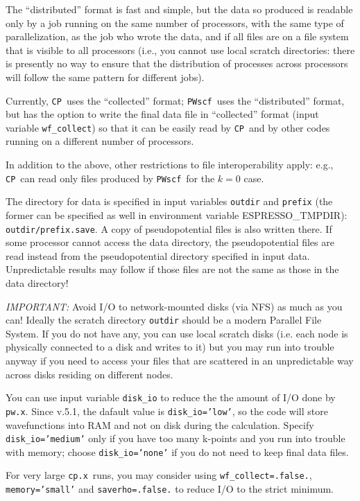 \documentclass[12pt,a4paper]{article}
\def\pwx{\texttt{pw.x}}
\def\cpx{\texttt{cp.x}}
\def\PWscf{\texttt{PWscf}}
\def\CP{\texttt{CP}}
\begin{document}
The ``distributed'' format is fast and simple,
but the data so produced is readable only by
a job running on the same number of processors,
with the same type of parallelization, as the
job who wrote the data, and if all
files are on a file system that is visible to all
processors (i.e., you cannot use local scratch
directories: there is presently no way to ensure
that the distribution of processes across
processors will follow the same pattern
for different jobs).

Currently, \CP\ uses the ``collected'' format;
\PWscf\ uses the ``distributed'' format, but
has the option to write the final data file in
``collected'' format (input variable \texttt{wf\_collect})
so that it can be easily read by \CP\ and by other
codes running on a different  number of processors.

In addition to the above, other restrictions to file
interoperability apply: e.g., \CP\ can read only files
produced by \PWscf\ for the $k=0$ case.

The directory for data is specified in input variables
\texttt{outdir} and \texttt{prefix} (the former can be specified
as well in environment variable ESPRESSO\_TMPDIR):
\texttt{outdir/prefix.save}. A copy of pseudopotential files
is also written there. If some processor cannot access the
data directory, the pseudopotential files are read instead
from the pseudopotential directory specified in input data.
Unpredictable results may follow if those files
are not the same as those in the data directory!

{\em IMPORTANT:}
Avoid I/O to network-mounted disks (via NFS) as much as you can!
Ideally the scratch directory \texttt{outdir} should be a modern
Parallel File System. If you do not have any, you can use local
scratch disks (i.e. each node is physically connected to a disk
and writes to it) but you may run into trouble anyway if you
need to access your files that are scattered in an unpredictable
way across disks residing on different nodes.

You can use input variable \texttt{disk\_io} to reduce the the
amount of I/O done by \pwx. Since v.5.1, the dafault value is
\texttt{disk\_io='low'}, so the code will store wavefunctions
into RAM and not on disk during the calculation. Specify
\texttt{disk\_io='medium'} only if you have too many k-points
and you run into trouble with memory; choose \texttt{disk\_io='none'}
if you do not need to keep final data files.

For very large \cpx\ runs, you may consider using
\texttt{wf\_collect=.false.}, \texttt{memory='small'} and
\texttt{saverho=.false.} to reduce I/O to the strict minimum.
\end{document}

